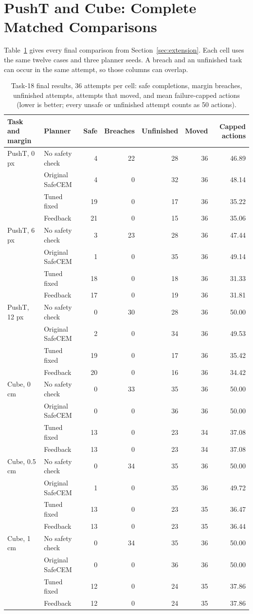 \section{PushT and Cube: Complete Matched Comparisons}\label{app:extension}
Table~\ref{tab:extension-all} gives every final comparison from
Section~\ref{sec:extension}. Each cell uses the same twelve cases and three
planner seeds. A breach and an unfinished task can occur in the same
attempt, so those columns can overlap.
\begin{table}[t]
\caption{Task-18 final results, 36 attempts per cell: safe completions,
margin breaches, unfinished attempts, attempts that moved, and mean
failure-capped actions (lower is better; every unsafe or unfinished attempt
counts as 50 actions).}
\label{tab:extension-all}\centering\small
\begin{tabular}{llrrrrr}\toprule
Task and margin & Planner & Safe & Breaches & Unfinished & Moved & Capped actions \\
\midrule
PushT, 0 px & No safety check & 4 & 22 & 28 & 36 & 46.89 \\
 & Original SafeCEM & 4 & 0 & 32 & 36 & 48.14 \\
 & Tuned fixed & 19 & 0 & 17 & 36 & 35.22 \\
 & Feedback & 21 & 0 & 15 & 36 & 35.06 \\
\midrule
PushT, 6 px & No safety check & 3 & 23 & 28 & 36 & 47.44 \\
 & Original SafeCEM & 1 & 0 & 35 & 36 & 49.14 \\
 & Tuned fixed & 18 & 0 & 18 & 36 & 31.33 \\
 & Feedback & 17 & 0 & 19 & 36 & 31.81 \\
\midrule
PushT, 12 px & No safety check & 0 & 30 & 28 & 36 & 50.00 \\
 & Original SafeCEM & 2 & 0 & 34 & 36 & 49.53 \\
 & Tuned fixed & 19 & 0 & 17 & 36 & 35.42 \\
 & Feedback & 20 & 0 & 16 & 36 & 34.42 \\
\midrule
Cube, 0 cm & No safety check & 0 & 33 & 35 & 36 & 50.00 \\
 & Original SafeCEM & 0 & 0 & 36 & 36 & 50.00 \\
 & Tuned fixed & 13 & 0 & 23 & 34 & 37.08 \\
 & Feedback & 13 & 0 & 23 & 34 & 37.08 \\
\midrule
Cube, 0.5 cm & No safety check & 0 & 34 & 35 & 36 & 50.00 \\
 & Original SafeCEM & 1 & 0 & 35 & 36 & 49.72 \\
 & Tuned fixed & 13 & 0 & 23 & 35 & 36.47 \\
 & Feedback & 13 & 0 & 23 & 35 & 36.44 \\
\midrule
Cube, 1 cm & No safety check & 0 & 34 & 35 & 36 & 50.00 \\
 & Original SafeCEM & 0 & 0 & 36 & 36 & 50.00 \\
 & Tuned fixed & 12 & 0 & 24 & 35 & 37.86 \\
 & Feedback & 12 & 0 & 24 & 35 & 37.86 \\
\bottomrule
\end{tabular}
\end{table}

